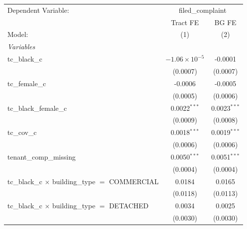 \begingroup
\centering
\begin{tabular}{lcc}
   \tabularnewline \midrule \midrule
   Dependent Variable: & \multicolumn{2}{c}{filed\_complaint}\\
                                                                       & Tract FE               & BG FE \\   
   Model:                                                              & (1)                    & (2)\\  
   \midrule
   \emph{Variables}\\
   tc\_black\_c                                                        & $-1.06\times 10^{-5}$  & -0.0001\\   
                                                                       & (0.0007)               & (0.0007)\\   
   tc\_female\_c                                                       & -0.0006                & -0.0005\\   
                                                                       & (0.0005)               & (0.0006)\\   
   tc\_black\_female\_c                                                & 0.0022$^{***}$         & 0.0023$^{***}$\\   
                                                                       & (0.0009)               & (0.0008)\\   
   tc\_cov\_c                                                          & 0.0018$^{***}$         & 0.0019$^{***}$\\   
                                                                       & (0.0006)               & (0.0006)\\   
   tenant\_comp\_missing                                               & 0.0050$^{***}$         & 0.0051$^{***}$\\   
                                                                       & (0.0004)               & (0.0004)\\   
   tc\_black\_c $\times$ building\_type $=$ COMMERCIAL                 & 0.0184                 & 0.0165\\   
                                                                       & (0.0118)               & (0.0113)\\   
   tc\_black\_c $\times$ building\_type $=$ DETACHED                   & 0.0034                 & 0.0025\\   
                                                                       & (0.0030)               & (0.0030)\\   

\end{tabular}
